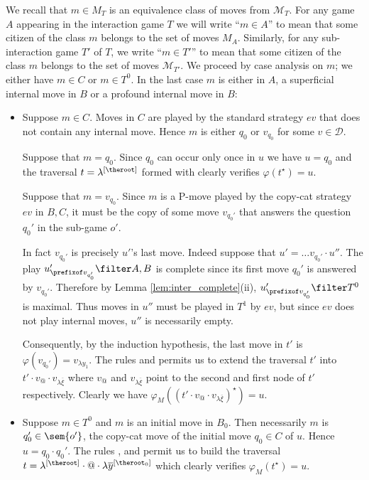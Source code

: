 \begin{itemize}[$\bullet$]
\begin{enumerate}
We recall that $m \in M_T$ is an equivalence class of moves
from $\mathcal{M}_T$. For any game $A$ appearing in the
interaction game $T$ we will write ``$m \in A$'' to mean
that some citizen of the class $m$ belongs to the set of
moves $M_A$. Similarly, for any sub-interaction game $T'$ of
$T$, we write ``$m \in T'$'' to mean that some citizen of
the class $m$ belongs to the set of moves
$\mathcal{M}_{T'}$. We proceed by case analysis on $m$; we either have $m\in C$ or $m\in T^0$. In the last case $m$ is either in $A$, a superficial internal move in $B$ or a profound internal move in $B$:
    \begin{itemize}
    \item Suppose $m \in C$. Moves in $C$ are played by the standard strategy $ev$ that does not contain any internal move. Hence $m$ is either $q_0$ or $v_{q_0}$ for some $v\in\mathcal{D}$.

    Suppose that $m=q_0$. Since $q_0$ can occur only once in
    $u$ we have $u=q_0$ and the traversal $t=\lambda^{[\theroot]}$ formed with  clearly verifies $\varphi(t^\star) = u$.

    Suppose that $m=v_{q_0}$. Since $m$ is a P-move played by the
    copy-cat strategy $ev$ in $B,C$, it must be the copy of some move $v_{q_0'}$ that answers the question $q_0'$ in the sub-game $o'$.

    In fact $v_{q_0'}$ is precisely $u'$'s last move. Indeed
    suppose that $u' = \ldots v_{q_0'} \cdot u''$. The play
    $u'_{\prefixof v_{q_0'}}\filter A,B$ is complete since its
    first move $q_0'$ is answered by $v_{q_0'}$. Therefore by
    Lemma \ref{lem:inter_complete}(ii), $u'_{\prefixof
    v_{q_0'}}\filter T^0$ is maximal. Thus moves in $u''$ must
    be played in $T^1$ by $ev$, but since $ev$ does not play internal
    moves, $u''$ is necessarily empty.

    Consequently, by the induction hypothesis, the last move in $t'$ is $\varphi(v_{q_0'}) = v_{\lambda y_1}$.
    The rules  and  permits us to extend
    the traversal $t'$ into $t' \cdot v_@ \cdot v_{\lambda \overline{\xi}}$ where $v_@$ and $v_{\lambda
    \overline{\xi}}$ point to the second and first node of $t'$ respectively. Clearly we have $\varphi_M((t'\cdot v_@ \cdot v_{\lambda \overline{\xi}})^\star) = u$.

    \item Suppose $m\in T^0$ and $m$ is an initial move in $B_0$.
    Then necessarily $m$ is $q_0' \in \sem{o'}$, the copy-cat move of the initial move $q_0 \in C$ of $u$. Hence $u = q_0 \cdot q_0'$. The rules , 
and  permit us to build the traversal $t =
\lambda^{[\theroot]} \cdot @ \cdot \lambda
\overline{y}^{[\theroot_0]}$ which clearly verifies
$\varphi_M(t^\star) = u$.


\end{itemize}
\end{enumerate}
\end{itemize}
